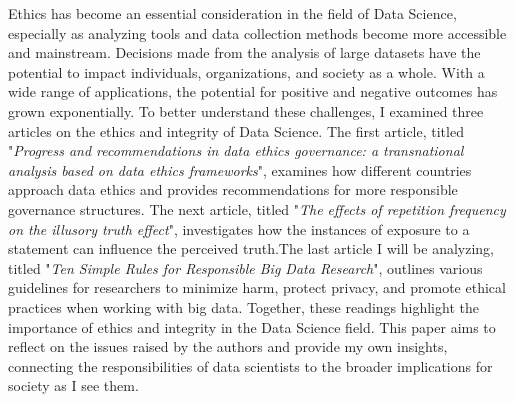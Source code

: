 \documentclass[12pt]{article}
\begin{document}


\singlespacing

\setlength{\parskip}{0.5em}

\setlength{\headheight}{15pt}  %
\setlength{\footskip}{40pt}    %

\begin{text}

Ethics has become an essential consideration in the field of Data Science, especially as analyzing tools and data collection methods become more accessible and mainstream. Decisions made from the analysis of large datasets have the potential to impact individuals, organizations, and society as a whole. With a wide range of applications, the potential for positive and negative outcomes has grown exponentially. To better understand these challenges, I examined three articles on the ethics and integrity of Data Science. The first article, titled "\textit{Progress and recommendations in data ethics governance: a transnational analysis based on data ethics frameworks}", examines how different countries approach data ethics and provides recommendations for more responsible governance structures. The next article, titled "\textit{The effects of repetition frequency on the illusory truth effect}", investigates how the instances of exposure to a statement can influence the perceived truth.The last article I will be analyzing, titled "\textit{Ten Simple Rules for Responsible Big Data Research}", outlines various guidelines for researchers to minimize harm, protect privacy, and promote ethical practices when working with big data. Together, these readings highlight the importance of ethics and integrity in the Data Science field. This paper aims to reflect on the issues raised by the authors and provide my own insights, connecting the responsibilities of data scientists to the broader implications for society as I see them.


\end{text}
\end{document}
